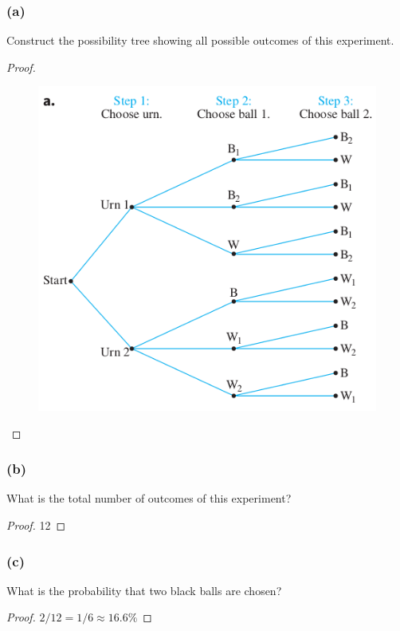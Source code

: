 \documentclass[14pt]{extarticle}
\begin{document}
\subsubsection{(a)}
Construct the possibility tree showing all possible outcomes of this experiment.

\begin{proof}
     \begin{figure}[ht!]
          \centering
          \includegraphics[scale=0.5]{../images/9.2.6.a.png}
     \end{figure}
\end{proof}

\subsubsection{(b)}
What is the total number of outcomes of this experiment?

\begin{proof}
     12
\end{proof}

\subsubsection{(c)}
What is the probability that two black balls are chosen?

\begin{proof}
     \(2/12 = 1/6 \approx 16.6\%\)
\end{proof}
\end{document}
